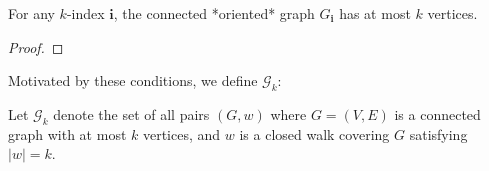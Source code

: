 










For any $k$-index $\mathbf{i}$, the connected *oriented* graph $G_\mathbf{i}$ has at most $k$ vertices. 

\begin{lemma}
  \label{lem:}
  \notready
  \uses{}
  

\end{lemma}
\begin{proof}

\end{proof}
Motivated by these conditions, we define $\mathcal{G}_k$:
\begin{definition}
  \label{def:}
  \notready
  \uses{}
  Let $\mathcal{G}_k$ denote the set of all pairs $(G,w)$ where $G = (V,E)$ is a connected graph with at most $k$ vertices, and
  $w$ is a closed walk covering $G$ satisfying $|w| = k$.
\end{definition}





